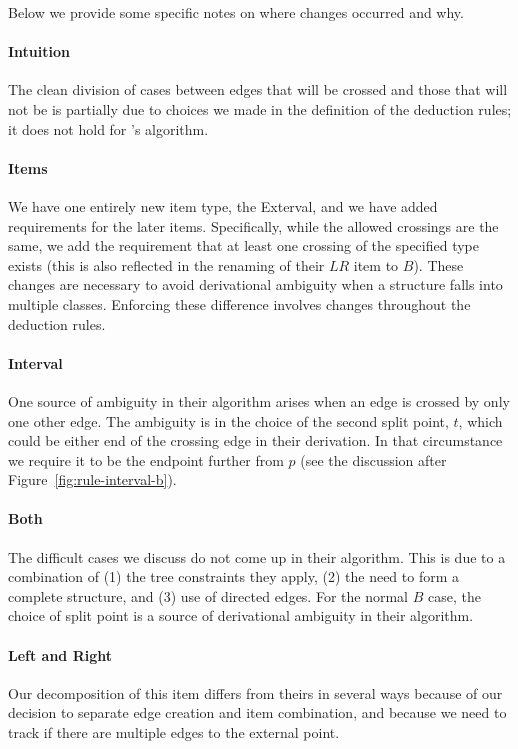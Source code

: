 Below we provide some specific notes on where changes occurred and why.

\paragraph{Intuition}
The clean division of cases between edges that will be crossed and those that will not be is partially due to choices we made in the definition of the deduction rules; it does not hold for \textcite{ec}'s algorithm.

\paragraph{Items}
We have one entirely new item type, the Exterval, and we have added requirements for the later items.
Specifically, while the allowed crossings are the same, we add the requirement that at least one crossing of the specified type exists (this is also reflected in the renaming of their $LR$ item to $B$).
These changes are necessary to avoid derivational ambiguity when a structure falls into multiple classes.
Enforcing these difference involves changes throughout the deduction rules.

\paragraph{Interval}
One source of ambiguity in their algorithm arises when an edge is crossed by only one other edge.
The ambiguity is in the choice of the second split point, $t$, which could be either end of the crossing edge in their derivation.
In that circumstance we require it to be the endpoint further from $p$ (see the discussion after Figure~\ref{fig:rule-interval-b}).

\paragraph{Both}
The difficult cases we discuss do not come up in their algorithm.
This is due to a combination of (1) the tree constraints they apply, (2) the need to form a complete structure, and (3) use of directed edges.
For the normal $B$ case, the choice of split point is a source of derivational ambiguity in their algorithm.

\paragraph{Left and Right}
Our decomposition of this item differs from theirs in several ways because of our decision to separate edge creation and item combination, and because we need to track if there are multiple edges to the external point.

